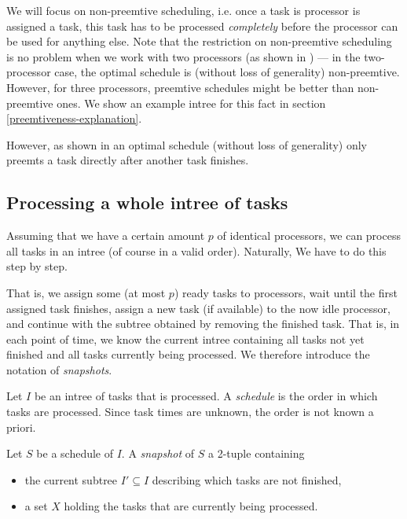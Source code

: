 We will focus on non-preemtive scheduling, i.e. once a task is processor is assigned a task, this task has to be processed \emph{completely} before the processor can be used for anything else. Note that the restriction on non-preemtive scheduling is no problem when we work with two processors (as shown in \cite{chandyreynoldslargepaper1979}) --- in the two-processor case, the optimal schedule is (without loss of generality) non-preemtive. However, for three processors, preemtive schedules might be better than non-preemtive ones. We show an example intree for this fact in section \ref{preemtiveness-explanation}.

However, as shown in \cite{chandyreynoldslargepaper1979} an optimal schedule (without loss of generality) only preemts a task directly after another task finishes.

\subsection{Processing a whole intree of tasks}
\label{sec:processing-an-intree-of-tasks}

Assuming that we have a certain amount $p$ of identical processors, we can process all tasks in an intree (of course in a valid order). Naturally, We have to do this step by step. 

That is, we assign some (at most $p$) ready tasks to processors, wait until the first assigned task finishes, assign a new task (if available) to the now idle processor, and continue with the subtree obtained by removing the finished task. That is, in each point of time, we know the current intree containing all tasks not yet finished and all tasks currently being processed. We therefore introduce the notation of \emph{snapshots}.

\begin{definition}  
  Let $I$ be an intree of tasks that is processed. A \emph{schedule} is the order in which tasks are processed. Since task times are unknown, the order is not known a priori.

  Let $S$ be a schedule of $I$.
  A \emph{snapshot} of $S$ a 2-tuple containing
  \begin{itemize}
  \item the current subtree $I'\subseteq I$ describing which tasks are not finished,
  \item a set $X$ holding the tasks that are currently being processed.
  \end{itemize}
\end{definition}

